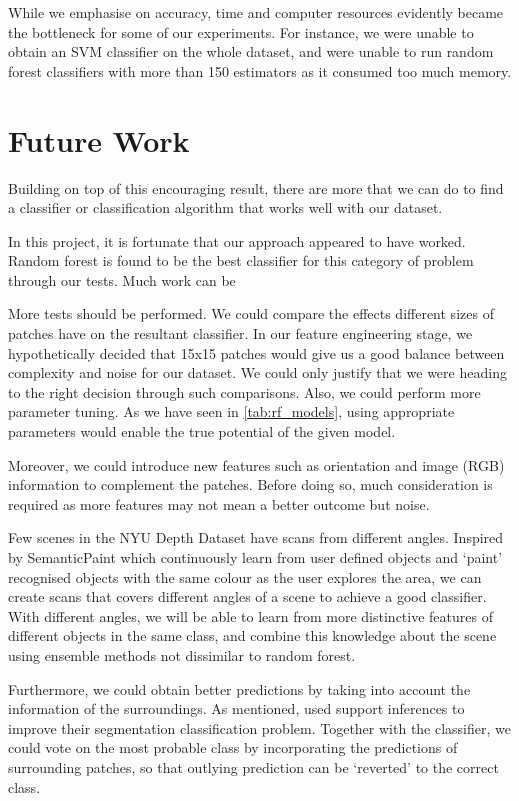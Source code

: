 While we emphasise on accuracy, time and computer resources evidently became the bottleneck for some of our experiments. For instance, we were unable to obtain an SVM classifier on the whole dataset, and were unable to run random forest classifiers with more than 150 estimators as it consumed too much memory. 

\section{Future Work} \label{sec:conc-future}
Building on top of this encouraging result, there are more that we can do to find a classifier or classification algorithm that works well with our dataset. 

In this project, it is fortunate that our approach appeared to have worked. Random forest is found to be the best classifier for this category of problem through our tests. Much work can be  

More tests should be performed. We could compare the effects different sizes of patches have on the resultant classifier. In our feature engineering stage, we hypothetically decided that 15x15 patches would give us a good balance between complexity and noise for our dataset. We could only justify that we were heading to the right decision through such comparisons. Also, we could perform more parameter tuning. As we have seen in \autoref{tab:rf_models}, using appropriate parameters would enable the true potential of the given model. 

Moreover, we could introduce new features such as orientation and image (RGB) information to complement the patches. Before doing so, much consideration is required as more features may not mean a better outcome but noise. 

Few scenes in the NYU Depth Dataset have scans from different angles. Inspired by SemanticPaint \cite{semantic-paint} which continuously learn from user defined objects and `paint' recognised objects with the same colour as the user explores the area, we can create scans that covers different angles of a scene to achieve a good classifier. With different angles, we will be able to learn from more distinctive features of different objects in the same class, and combine this knowledge about the scene using ensemble methods not dissimilar to random forest.

Furthermore, we could obtain better predictions by taking into account the information of the surroundings. As mentioned,  used support inferences to improve their segmentation classification problem. Together with the classifier, we could vote on the most probable class by incorporating the predictions of surrounding patches, so that outlying prediction can be `reverted' to the correct class. 

